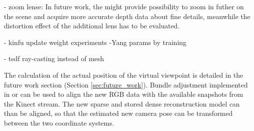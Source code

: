\documentclass{ucl_thesis}
\newcommand{\secref}[1]{(Section \ref{#1})}
\begin{document}
    - zoom lense: \citep{Kinect_nyko_zoom}
In future work, the \citep{Kinect_nyko_zoom} might provide possibility to zoom in futher on the scene and acquire more accurate depth data about fine details, meanwhile the distortion effect of the additional lens has to be evaluated.

- kinfu update weight experiments
-Yang params by training

- tsdf ray-casting instead of mesh

\par The calculation of the actual position of the virtual viewpoint is detailed in the future work section \secref{sec:future_work}. Bundle adjustment implemented in \citep{SnavelySS06} or \citep{vsfm} can be used to align the new RGB data with the available snapshots from the Kinect stream. The new sparse and stored dense reconstruction model can than be aligned, so that the estimated new camera pose can be transformed between the two coordinate systems.
\end{document}
